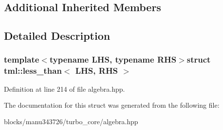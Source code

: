 \subsection*{Additional Inherited Members}


\subsection{Detailed Description}
\subsubsection*{template$<$typename L\+H\+S, typename R\+H\+S$>$struct tml\+::less\+\_\+than$<$ L\+H\+S, R\+H\+S $>$}



Definition at line 214 of file algebra.\+hpp.



The documentation for this struct was generated from the following file\+:\begin{DoxyCompactItemize}
\item 
blocks/manu343726/turbo\+\_\+core/algebra.\+hpp\end{DoxyCompactItemize}
